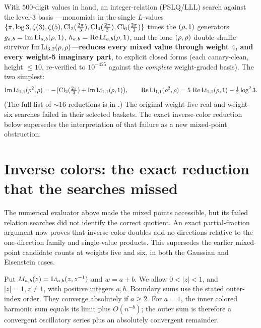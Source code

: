 With $500$-digit values in hand, an integer-relation (PSLQ/LLL) search against the level-3 basis
---monomials in the single $L$-values $\{\pi,\log 3,\zeta(3),\zeta(5),\operatorname{Cl}_2(\tfrac{2\pi}3),
\operatorname{Cl}_4(\tfrac{2\pi}3),\operatorname{Cl}_6(\tfrac{2\pi}3)\}$ times the $(\rho,1)$ generators
$g_{a,b}=\operatorname{Im}\operatorname{Li}_{a,b}(\rho,1)$, $h_{a,b}=\operatorname{Re}\operatorname{Li}_{a,b}(\rho,1)$, and the lone $(\rho,\rho)$
double-shuffle survivor $\operatorname{Im}\operatorname{Li}_{3,2}(\rho,\rho)$---\textbf{reduces every mixed value through weight
$4$, and every weight-5 imaginary part}, to explicit closed forms (each canary-clean, height $\le 10$,
re-verified to $10^{-425}$ against the \emph{complete} weight-graded basis). The two simplest:
\begin{equation}\label{mixed:eq:eis-w2}
  \operatorname{Im}\operatorname{Li}_{1,1}(\rho^2,\rho)=-\bigl(\operatorname{Cl}_2(\tfrac{2\pi}3)+\operatorname{Im}\operatorname{Li}_{1,1}(\rho,1)\bigr),\qquad
  \operatorname{Re}\operatorname{Li}_{1,1}(\rho^2,\rho)=5\,\operatorname{Re}\operatorname{Li}_{1,1}(\rho,1)-\tfrac12\log^2 3.
\end{equation}
(The full list of ${\sim}16$ reductions is in .) The original weight-five real and weight-six searches failed in their
selected baskets. The exact inverse-color reduction below supersedes the
interpretation of that failure as a new mixed-point obstruction.

\section{Inverse colors: the exact reduction that the searches missed}
The numerical evaluator above made the mixed points accessible, but its
failed relation searches did not identify the correct quotient. An exact
partial-fraction argument now proves that inverse-color doubles add no
directions relative to the one-direction family and single-value products.
This supersedes the earlier mixed-point candidate counts at weights five
and six, in both the Gaussian and Eisenstein cases.

Put \(M_{a,b}(z)=\operatorname{Li}_{a,b}(z,z^{-1})\) and \(w=a+b\).
We allow \(0<|z|<1\), and \(|z|=1,z\ne1\), with positive integers
\(a,b\). Boundary sums use the stated outer-index order. They converge
absolutely if \(a\ge2\). For \(a=1\), the inner colored harmonic sum
equals its limit plus \(O(n^{-b})\); the outer sum is therefore a
convergent oscillatory series plus an absolutely convergent remainder.

